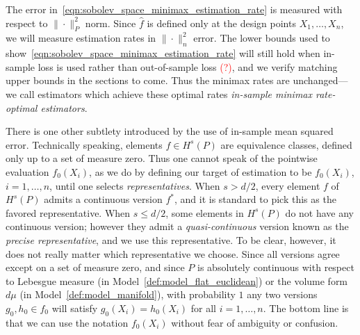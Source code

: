 \documentclass{article}
\newcommand{\1}{\mathbf{1}}
\newcommand{\wh}[1]{\widehat{#1}}
\theoremstyle{alden}
\theoremstyle{aldenthm}
\theoremstyle{definition}
\theoremstyle{remark}
\begin{document}
The error in~\eqref{eqn:sobolev_space_minimax_estimation_rate} is measured with respect to $\|\cdot\|_P^2$ norm. Since $\wh{f}$ is defined only at the design points $X_1,\ldots,X_n$, we will measure estimation rates in $\|\cdot\|_n^2$ error. The lower bounds used to show~\eqref{eqn:sobolev_space_minimax_estimation_rate} will still hold when in-sample loss is used rather than out-of-sample loss \textcolor{red}{(?)}, and we verify matching upper bounds in the sections to come. Thus the minimax rates are unchanged---we call estimators which achieve these optimal rates \emph{in-sample minimax rate-optimal estimators}.

There is one other subtlety introduced by the use of in-sample mean squared error. Technically speaking, elements $f \in H^s(P)$ are equivalence classes, defined only up to a set of measure zero. Thus one cannot speak of the pointwise evaluation $f_0(X_i)$, as we do by defining our target of estimation to be $f_0(X_i)$, $i=1,\ldots,n$, until one selects \emph{representatives}. When $s > d/2$, every element $f$ of $H^s(P)$ admits a continuous version $f^{\ast}$, and it is standard to pick this as the favored representative. When $s \leq d/2$, some elements in $H^s(P)$ do not have any continuous version; however they admit a \emph{quasi-continuous} version \citep{evans15} known as the \emph{precise representative}, and we use this representative. To be clear, however, it does not really matter which representative we choose. Since all versions agree except on a set of measure zero, and since $P$ is absolutely continuous with respect to Lebesgue measure (in Model~\ref{def:model_flat_euclidean}) or the volume form $d\mu$ (in Model~\ref{def:model_manifold}), with probability $1$ any two versions $g_0, h_0 \in f_0$ will satisfy $g_0(X_i) = h_0(X_i)$ for all $i = 1,\ldots,n$. The bottom line is that we can use the notation $f_0(X_i)$ without fear of ambiguity or confusion.

\end{document}
